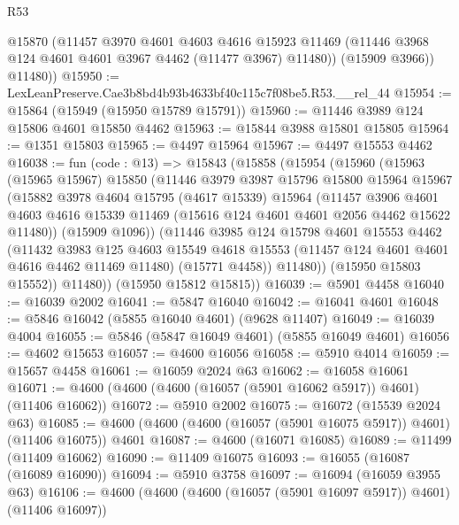 \begin{lexlean}{R53}
\begin{coremodule}
          @15870
          (@11457
            @3970
            @4601
            @4603
            @4616
            @15923
            @11469
            (@11446 @3968 @124 @4601 @4601 @3967 @4462 (@11477 @3967) @11480))
          (@15909 @3966))
        @11480))
@15950 := LexLeanPreserve.Cae3b8bd4b93b4633bf40c115c7f08be5.R53.__rel_44
@15954 := @15864 (@15949 (@15950 @15789 @15791))
@15960 := @11446 @3989 @124 @15806 @4601 @15850 @4462
@15963 := @15844 @3988 @15801 @15805
@15964 := @1351 @15803
@15965 := @4497 @15964
@15967 := @4497 @15553 @4462
@16038 := fun (code : @13) =>
  @15843
    (@15858
      (@15954
        (@15960
          (@15963
            (@15965 @15967)
            @15850
            (@11446
              @3979
              @3987
              @15796
              @15800
              @15964
              @15967
              (@15882
                @3978
                @4604
                @15795
                (@4617 @15339)
                @15964
                (@11457
                  @3906
                  @4601
                  @4603
                  @4616
                  @15339
                  @11469
                  (@15616 @124 @4601 @4601 @2056 @4462 @15622 @11480))
                (@15909 @1096))
              (@11446
                @3985
                @124
                @15798
                @4601
                @15553
                @4462
                (@11432
                  @3983
                  @125
                  @4603
                  @15549
                  @4618
                  @15553
                  (@11457 @124 @4601 @4601 @4616 @4462 @11469 @11480)
                  (@15771 @4458))
                @11480))
            (@15950 @15803 @15552))
          @11480))
      (@15950 @15812 @15815))
@16039 := @5901 @4458
@16040 := @16039 @2002
@16041 := @5847 @16040
@16042 := @16041 @4601
@16048 := @5846 @16042 (@5855 @16040 @4601) (@9628 @11407)
@16049 := @16039 @4004
@16055 := @5846 (@5847 @16049 @4601) (@5855 @16049 @4601)
@16056 := @4602 @15653
@16057 := @4600 @16056
@16058 := @5910 @4014
@16059 := @15657 @4458
@16061 := @16059 @2024 @63
@16062 := @16058 @16061
@16071 := @4600 (@4600 (@4600 (@16057 (@5901 @16062 @5917)) @4601) (@11406 @16062))
@16072 := @5910 @2002
@16075 := @16072 (@15539 @2024 @63)
@16085 := @4600 (@4600 (@4600 (@16057 (@5901 @16075 @5917)) @4601) (@11406 @16075)) @4601
@16087 := @4600 (@16071 @16085)
@16089 := @11499 (@11409 @16062)
@16090 := @11409 @16075
@16093 := @16055 (@16087 (@16089 @16090))
@16094 := @5910 @3758
@16097 := @16094 (@16059 @3955 @63)
@16106 := @4600 (@4600 (@4600 (@16057 (@5901 @16097 @5917)) @4601) (@11406 @16097))

\end{coremodule}
\end{lexlean}
